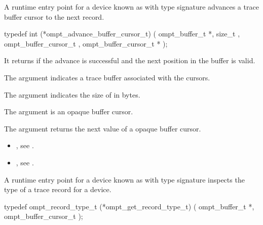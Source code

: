 \label{sec:ompt_advance_buffer_cursor_t}


\summary
A runtime entry point for a device known as 
with type signature 
advances a trace buffer cursor to the next record.

\format
\begin{ccppspecific}
\begin{omptInquiry}
typedef int (*ompt_advance_buffer_cursor_t) (
  ompt_buffer_t *,
  size_t ,
  ompt_buffer_cursor_t ,
  ompt_buffer_cursor_t *
);
\end{omptInquiry}
\end{ccppspecific}

\descr
It returns  if the advance is successful and the next
position in the buffer is valid.

\argdesc

\devicedesc

The argument  indicates a trace buffer associated
with the cursors.

The argument  indicates the size of  in
bytes.

The argument  is an opaque buffer cursor.

The argument  returns the next value of a opaque buffer cursor.


\crossreferences
\begin{itemize}
\item {},
see .
\item {},
see .
\end{itemize}

\label{sec:ompt_get_record_type_t}

\summary
A runtime entry point for a device known as
 with type signature
 inspects the type
of a trace record for a device.

\format
\begin{ccppspecific}
\begin{omptInquiry}
typedef ompt_record_type_t (*ompt_get_record_type_t) (
  ompt_buffer_t *,
  ompt_buffer_cursor_t 
);
\end{omptInquiry}
\end{ccppspecific}

